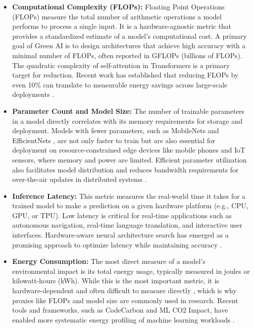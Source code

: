 \documentclass[12pt, a4paper]{article}
\begin{document}
\begin{itemize}
    \item \textbf{Computational Complexity (FLOPs):} Floating Point Operations (FLOPs) measure the total number of arithmetic operations a model performs to process a single input. It is a hardware-agnostic metric that provides a standardized estimate of a model's computational cost. A primary goal of Green AI is to design architectures that achieve high accuracy with a minimal number of FLOPs, often reported in GFLOPs (billions of FLOPs). The quadratic complexity of self-attention in Transformers \cite{dosovitskiy2020image} is a primary target for reduction. Recent work has established that reducing FLOPs by even 10\% can translate to measurable energy savings across large-scale deployments \cite{desislavov2023compute}.

    \item \textbf{Parameter Count and Model Size:} The number of trainable parameters in a model directly correlates with its memory requirements for storage and deployment. Models with fewer parameters, such as MobileNets \cite{howard2017mobilenets} and EfficientNets \cite{tan2019efficientnet}, are not only faster to train but are also essential for deployment on resource-constrained edge devices like mobile phones and IoT sensors, where memory and power are limited. Efficient parameter utilization also facilitates model distribution and reduces bandwidth requirements for over-the-air updates in distributed systems \cite{cai2020once}.

    \item \textbf{Inference Latency:} This metric measures the real-world time it takes for a trained model to make a prediction on a given hardware platform (e.g., CPU, GPU, or TPU). Low latency is critical for real-time applications such as autonomous navigation, real-time language translation, and interactive user interfaces. Hardware-aware neural architecture search has emerged as a promising approach to optimize latency while maintaining accuracy \cite{cai2019proxylessnas, wu2019fbnet}.

    \item \textbf{Energy Consumption:} The most direct measure of a model's environmental impact is its total energy usage, typically measured in joules or kilowatt-hours (kWh). While this is the most important metric, it is hardware-dependent and often difficult to measure directly \cite{garcia2019estimation}, which is why proxies like FLOPs and model size are commonly used in research. Recent tools and frameworks, such as CodeCarbon and ML CO2 Impact, have enabled more systematic energy profiling of machine learning workloads \cite{lacoste2019quantifying, anthony2020carbontracker}.


\end{itemize}
\end{document}
